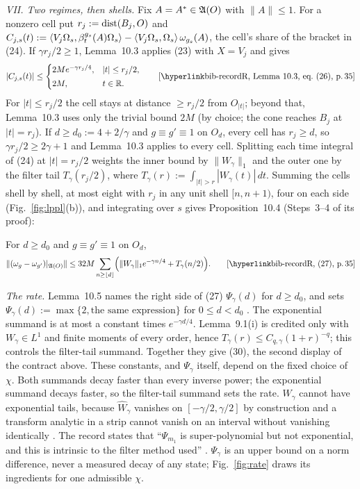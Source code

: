 \emph{VII. Two regimes, then shells.} Fix $A=A^*\in\mathfrak{A}(O)$ with $\|A\|\le1$. For a
nonzero cell put $r_j:=\operatorname{dist}(B_j,O)$ and
$C_{j,s}(t):=\langle V_j\Omega_s,\beta^{g_s}_t(A)\Omega_s\rangle-\langle V_j\Omega_s,\Omega_s\rangle\,\omega_{g_s}(A)$,
the cell's share of the bracket in (24). If $\gamma r_j/2\ge1$, Lemma~10.3 applies (23)
with $X=V_j$ and gives
\begin{equation*}
 |C_{j,s}(t)|\le
 \begin{cases}
 2Me^{-\gamma r_j/4},&|t|\le r_j/2,\\[2pt]
 2M,&t\in\R .
 \end{cases}
 \tag*{\rec{Lemma~10.3, eq.~(26)}{35}}
\end{equation*}
For $|t|\le r_j/2$ the cell stays at distance $\ge r_j/2$ from $O_{|t|}$; beyond that,
Lemma~10.3 uses only the trivial bound $2M$ (by choice; the cone reaches $B_j$ at
$|t|=r_j$). If $d\ge d_0:=4+2/\gamma$ and $g\equiv g'\equiv1$ on $O_d$, every cell has
$r_j\ge d$, so $\gamma r_j/2\ge2\gamma+1$ and Lemma~10.3 applies to every cell.
Splitting each time integral of (24) at $|t|=r_j/2$ weights the inner bound by
$\|W_\gamma\|_1$ and the outer one by the filter tail $T_\gamma(r_j/2)$, where
$T_\gamma(r):=\int_{|t|>r}|W_\gamma(t)|\,dt$. Summing the cells shell by shell, at most
eight with $r_j$ in any unit shell $[n,n+1)$, four on each side
(Fig.~\ref{fig:lppl}(b)), and integrating over $s$ gives Proposition~10.4 (Steps~3--4 of
its proof):
\begin{checkpoint}
For $d\ge d_0$ and $g\equiv g'\equiv1$ on $O_d$,
\begin{equation*}
 \|(\omega_g-\omega_{g'})|_{\A(O)}\|
 \le32M\sum_{n\ge\lfloor d\rfloor}
 \Bigl(\|W_\gamma\|_1e^{-\gamma n/4}+T_\gamma(n/2)\Bigr) .
 \tag*{\rec{(27)}{35}}
\end{equation*}
\end{checkpoint}

\emph{The rate.} Lemma~10.5 names the right side of (27) $\Psi_\gamma(d)$ for $d\ge d_0$,
and sets $\Psi_\gamma(d):=\max\{2,\text{the same expression}\}$ for $0\le d<d_0$
. The exponential summand is at most a constant times
$e^{-\gamma d/4}$. Lemma~9.1(i) is credited only with $W_\gamma\in L^1$ and finite
moments of every order, hence $T_\gamma(r)\le C_{q,\gamma}(1+r)^{-q}$; this controls the
filter-tail summand. Together they give (30), the second display of the contract above.
These constants, and $\Psi_\gamma$ itself, depend on the fixed choice of $\chi$.
Both summands decay faster than every inverse power; the exponential summand decays
faster, so the filter-tail summand sets the rate. $W_\gamma$ cannot have exponential
tails, because $\widehat W_\gamma$ vanishes on $[-\gamma/2,\gamma/2]$ by construction and
a transform analytic in a strip cannot vanish on an interval without vanishing
identically . The record states that ``$\Psi_{m_1}$ is super-polynomial but
not exponential, and this is intrinsic to the filter method used'' .
$\Psi_\gamma$ is an upper bound on a norm difference, never a measured decay of any
state; Fig.~\ref{fig:rate} draws its ingredients for one admissible $\chi$.

